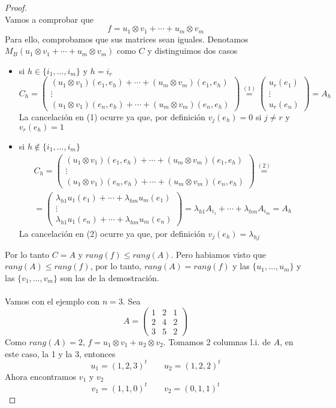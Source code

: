\documentclass[12pt]{article}
\theoremstyle{break}
\newtheorem*{proof}{Demostración}
\begin{document}
\begin{proof}
\[	\]
	Vamos a comprobar que
	\[
		f = u_1 \otimes v_1 + \cdots + u_m \otimes v_m
	\]
	Para ello, comprobamos que sus matrices sean iguales. Denotamos
	$M_B(u_1 \otimes v_1 + \cdots + u_m \otimes v_m)$ como $C$ y distinguimos dos casos
	\begin{itemize}
		\item si $h \in \{i_1,\dots,i_m\}$ y $h = i_r$
		\[
			C_h = \begin{pmatrix}
				(u_1 \otimes v_1)(e_1,e_h) + \cdots + (u_m \otimes v_m)(e_1,e_h) \\ \vdots \\
				(u_1 \otimes v_1)(e_n,e_h) + \cdots + (u_m \otimes v_m)(e_n,e_h)
			\end{pmatrix}
			\stackrel{(1)}{=} \begin{pmatrix}
				u_r(e_1) \\ \vdots \\ u_r(e_n)
			\end{pmatrix} = A_h
		\]
		La cancelación en (1) ocurre ya que, por definición $v_j(e_h) = 0$ si $j \neq r$ y
		$v_r(e_h) = 1$
		\item si $h \notin \{i_1,\dots,i_m\}$
		\begin{gather*}
			C_h = \begin{pmatrix}
			(u_1 \otimes v_1)(e_1,e_h) + \cdots + (u_m \otimes v_m)(e_1,e_h) \\ \vdots \\
			(u_1 \otimes v_1)(e_n,e_h) + \cdots + (u_m \otimes v_m)(e_n,e_h)
			\end{pmatrix} \stackrel{(2)}{=} \\ = \begin{pmatrix}
				\lambda_{h1}u_1(e_1) + \cdots + \lambda_{hm}u_m(e_1) \\ \vdots \\
				\lambda_{h1}u_1(e_n) + \cdots + \lambda_{hm}u_m(e_n)
			\end{pmatrix} = \lambda_{h1}A_{i_1} + \cdots + \lambda_{hm}A_{i_m} = A_h
		\end{gather*}
		La cancelación en (2) ocurre ya que, por definición $v_j(e_h) = \lambda_{hj}$
	\end{itemize}
	Por lo tanto $C = A$ y $rang(f) \leq rang(A)$. Pero habiamos visto que
	$rang(A) \leq rang(f)$, por lo tanto, $rang(A) = rang(f)$ y las $\{u_1,\dots,u_m\}$ y
	las $\{v_1,\dots,v_m\}$ son las de la demostración.
	\\ \\
	Vamos con el ejemplo con $n = 3$. Sea
	\[
		A = \begin{pmatrix}
		1 & 2 & 1 \\ 2 & 4 & 2 \\ 3 & 5 & 2
		\end{pmatrix}
	\]
	Como $rang(A)=2$, $f = u_1 \otimes v_1+u_2 \otimes v_2$. Tomamos 2 columnas l.i. de $A$, 
	en este caso, la 1 y la 3, entonces
	\[
		u_1 = (1,2,3)^t \qquad u_2=(1,2,2)^t
	\]
	Ahora encontramos $v_1$ y $v_2$
	\[
		v_1 = (1,1,0)^t \qquad v_2 = (0,1,1)^t
	\]
\end{proof}
\end{document}

